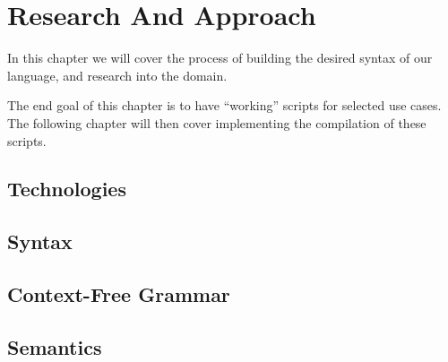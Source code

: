 \chapter{Research And Approach}\label{ch:approach}
In this chapter we will cover the process of building the desired syntax of our language, and research into the domain.

The end goal of this chapter is to have ``working'' scripts for selected use cases.
The following chapter will then cover implementing the compilation of these scripts.


\section{Technologies}



\section{Syntax}\label{sec:syntax}


\section{Context-Free Grammar}\label{sec:grammar}


\section{Semantics}\label{sec:semantics}
